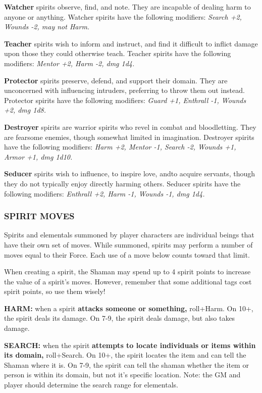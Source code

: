 \documentclass[oneside,10pt]{article}
\begin{document}
\begin{multicols}{2}
\textbf{Watcher} spirits observe, find, and note. They are incapable of
dealing harm to anyone or anything. Watcher spirits have the
following modifiers: \textit{Search +2, Wounds -2, may not Harm.}

\textbf{Teacher} spirits wish to inform and instruct, and find it difficult to inflict damage upon those they could otherwise teach.
Teacher spirits have the following modifiers: \textit{Mentor +2,
Harm -2, dmg 1d4.}

\textbf{Protector} spirits preserve, defend, and support their domain.
They are unconcerned with influencing intruders, preferring to
throw them out instead. Protector spirits have the following
modifiers:\textit{ Guard +1, Enthrall -1, Wounds +2, dmg 1d8.}

\textbf{Destroyer} spirits are warrior spirits who revel in combat and
bloodletting. They are fearsome enemies, though somewhat
limited in imagination. Destroyer spirits have the following
modifiers:\textit{ Harm +2, Mentor -1, Search -2, Wounds +1, Armor +1, dmg 1d10.}

\textbf{Seducer} spirits wish to influence, to inspire love, andto acquire servants, though they do not typically enjoy directly
harming others. Seducer spirits have the following modifiers:
\textit{Enthrall +2, Harm -1, Wounds -1, dmg 1d4.}

\subsubsection{SPIRIT MOVES}
Spirits and elementals summoned by player characters are
individual beings that have their own set of moves. While
summoned, spirits may perform a number of moves equal to
their Force. Each use of a move below counts
toward that limit.

When creating a spirit, the Shaman may spend up to 4 spirit
points to increase the value of a spirit’s moves. However,
remember that some additional tags cost spirit points, so use
them wisely!

\textbf{HARM:} when a spirit \textbf{attacks someone or something,}
roll+Harm. On 10+, the spirit deals its damage. On 7-9, the
spirit deals damage, but also takes damage.

\textbf{SEARCH:} when the spirit \textbf{attempts to locate individuals or
items within its domain,} roll+Search. On 10+, the spirit locates the item and can tell the Shaman where it is. On 7-9,
the spirit can tell the shaman whether the item or person is
within its domain, but not it’s specific location. Note: the GM
and player should determine the search range for elementals.


\end{multicols}
\end{document}
